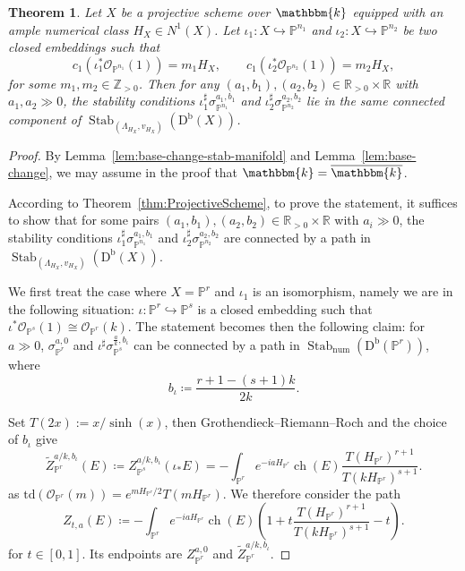 \documentclass[11pt, reqno]{amsart}
\numberwithin{equation}{section}
\theoremstyle{plain}
\newtheorem{theorem}{Theorem}[section]
\theoremstyle{remark}
\theoremstyle{definition}
\theoremstyle{italicsname}
\newcommand{\Db}{\mathrm{D^b}}
\newcommand{\num}{\mathrm{num}}
\DeclareMathOperator{\Stab}{Stab}
\DeclareMathOperator{\ch}{{ch}}
\newcommand{\td}{\mathrm{td}}
\newcommand{\cO}{\mathcal{O}}
\newcommand{\KK}{\mathbbm{k}}
\def\RR{\ensuremath{\mathbb{R}}}
\def\ZZ{\ensuremath{\mathbb{Z}}}
\def\PP{\ensuremath{\mathbb{P}}}
\begin{document}
\begin{theorem}\label{thm:canonical-component}
Let $X$ be a projective scheme over $\KK$ equipped with an ample numerical class $H_X \in N^1(X)$. 
Let $\iota_1\colon X\hookrightarrow \PP^{n_1}$ and $\iota_2\colon X\hookrightarrow \PP^{n_2}$ be two closed embeddings such that 
\[
c_1(\iota^*_{1}\cO_{\PP^{n_1}}(1))=m_1 H_X,\qquad c_1(\iota^*_{2}\cO_{\PP^{n_2}}(1))=m_2 H_X,
\]
for some $m_1,m_2\in \ZZ_{>0}$. 
Then for any $(a_1,b_1),(a_2,b_2)\in \RR_{>0}\times \RR$ with $a_1,a_2\gg 0$, the stability conditions $\iota_1^{\sharp}\sigma_{\PP^{n_1}}^{a_1,b_1}$ and $\iota_2^{\sharp}\sigma_{\PP^{n_2}}^{a_2,b_2}$ lie in the same connected component of $\Stab_{(\Lambda_{H_X},v_{H_X})}(\Db(X))$.
\end{theorem}

\begin{proof}
By Lemma~\ref{lem:base-change-stab-manifold} and Lemma~\ref{lem:base-change}, we may assume in the proof that $\KK=\overline{\KK}$.

According to Theorem~\ref{thm:ProjectiveScheme}, to prove the statement, it suffices to show that for some pairs $(a_1,b_1),(a_2,b_2)\in \RR_{>0}\times\RR$ with $a_i\gg 0$, the stability conditions $\iota_1^{\sharp}\sigma_{\PP^{n_1}}^{a_1,b_1}$ and $\iota_2^{\sharp}\sigma_{\PP^{n_2}}^{a_2,b_2}$ are connected by a path in $\Stab_{(\Lambda_{H_X},v_{H_X})}(\Db(X))$.

We first treat the case where $X=\PP^r$ and $\iota_1$ is an isomorphism, namely we are in the following situation: $\iota\colon \PP^r\hookrightarrow\PP^s$ is a closed embedding such that $\iota^*\cO_{\PP^s}(1)\cong\cO_{\PP^r}(k)$. 
The statement becomes then the following claim: for $a\gg 0$, $\sigma_{\PP^r}^{a,0}$ and $\iota^{\sharp}\sigma_{\PP^s}^{\frac{a}{k},b_{\iota}}$ can be connected by a path in $\Stab_{\num}(\Db(\PP^r))$, where
\begin{equation*}\label{eq:Canonicitybalpha}
	b_{\iota}\coloneqq\frac{r+1-(s+1)k}{2k}.
\end{equation*}

Set $T(2x):=x/\sinh(x)$, then Grothendieck--Riemann--Roch
and the choice of $b_\iota$ give
\begin{equation*}\label{eq:CanonicityThetaCharge}
	\widetilde Z_{\PP^r}^{a/k,b_\iota}(E)
	\coloneqq Z_{\PP^s}^{a/k,b_\iota}(\iota_*E)
	=-\int_{\PP^r}e^{-iaH_{\PP^r}}\ch(E)\frac{T(H_{\PP^r})^{r+1}}{T(k H_{\PP^r})^{s+1}}.
\end{equation*}
as $\td(\cO_{\PP^r}(m))=e^{mH_{\PP^r}/2}T(mH_{\PP^r})$. We therefore consider the path
\begin{equation*}\label{eq:CanonicityCentralChargePath}
Z_{t,a}(E)
\coloneqq
-\int_{\PP^r}e^{-iaH_{\PP^r}}\ch(E)\left(1+t\frac{T(H_{\PP^r})^{r+1}}{T(k H_{\PP^r})^{s+1}}-t\right).
\end{equation*}
for $t\in[0,1]$. Its endpoints are $Z_{\PP^r}^{a,0}$ and
$\widetilde Z_{\PP^r}^{a/k,b_\iota}$.


\end{proof}
\end{document}
